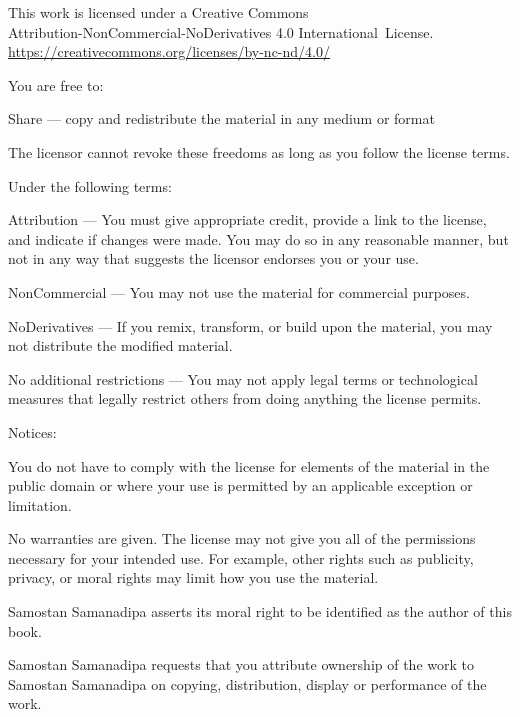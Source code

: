 \thispagestyle{plain}

\vspace*{-3\onelineskip}
\enlargethispage{2\onelineskip}

{\fontsize{8}{10}\selectfont\setlength{\parindent}{0pt}%
\raggedright\label{copyright-details}
\setlength{\parskip}{4pt}
{\centering

{\large\ccbyncnd}

This work is licensed under a Creative Commons\\
Attribution-NonCommercial-NoDerivatives 4.0 International~License.\\
\href{https://creativecommons.org/licenses/by-nc-nd/4.0/}{https://creativecommons.org/licenses/by-nc-nd/4.0/}

}

You are free to:

\begin{packeditemize}
\item Share — copy and redistribute the material in any medium or format
\end{packeditemize}

The licensor cannot revoke these freedoms as long as you follow the license terms.

Under the following terms:

\begin{packeditemize}
\item Attribution — You must give appropriate credit, provide a link to the license, and indicate if changes were made. You may do so in any reasonable manner, but not in any way that suggests the licensor endorses you or your use.
\item NonCommercial — You may not use the material for commercial purposes.
\item NoDerivatives — If you remix, transform, or build upon the material, you may not distribute the modified material.
\end{packeditemize}

No additional restrictions — You may not apply legal terms or technological measures that legally restrict others from doing anything the license permits.

Notices:

You do not have to comply with the license for elements of the material in the public domain or where your use is permitted by an applicable exception or limitation.

No warranties are given. The license may not give you all of the permissions necessary for your intended use. For example, other rights such as publicity, privacy, or moral rights may limit how you use the material.

Samostan Samanadipa asserts its moral right to be identified as the author of this book.

Samostan Samanadipa requests that you attribute ownership of the work to Samostan Samanadipa on copying, distribution, display or performance of the work.

}

